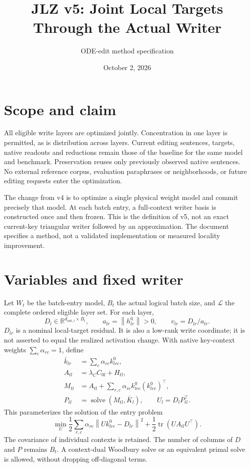 \documentclass[11pt]{article}
\title{JLZ v5: Joint Local Targets Through the Actual Writer}
\author{ODE-edit method specification}
\date{October 2, 2026}
\newcommand{\tr}{\operatorname{tr}}
\newcommand{\norm}[1]{\left\lVert#1\right\rVert}
\newcommand{\RR}{\mathbb R}
\begin{document}
\maketitle

\section{Scope and claim}
All eligible write layers are optimized jointly. Concentration in one
layer is permitted, as is distribution across layers. Current editing
sentences, targets, native readouts and reductions remain those of the
baseline for the same model and benchmark. Preservation reuses only
previously observed native sentences. No external reference corpus,
evaluation paraphrases or neighborhoods, or future editing requests enter
the optimization.

The change from v4 is to optimize a single physical weight model and
commit precisely that model. At each batch entry, a full-context writer
basis is constructed once and then frozen. This is the definition of v5,
not an exact current-key triangular writer followed by an approximation.
The document specifies a method, not a validated implementation or
measured locality improvement.

\section{Variables and fixed writer}
Let $W_t$ be the batch-entry model, $B_t$ the actual logical batch size,
and $\mathcal L$ the complete ordered eligible layer set. For each layer,
\[
D_l\in\RR^{d_{\mathrm{out},l}\times B_t},\qquad
a_{lr}=\norm{h^0_{lr}}>0,\qquad v_{lr}=D_{lr}/a_{lr}.
\]
$D_{lr}$ is a nominal local-target residual. It is also a low-rank write
coordinate; it is not asserted to equal the realized activation change.
With native key-context weights $\sum_c\alpha_{rc}=1$, define
\begin{align}
\bar k_{lr}&=\sum_c\alpha_{rc}k^0_{lrc},\\
A_{tl}&=\lambda_C C_{0l}+H_{tl},\\
M_{tl}&=A_{tl}+\sum_{r,c}\alpha_{rc}k^0_{lrc}(k^0_{lrc})^\top,\\
P_{tl}&=\operatorname{solve}(M_{tl},\bar K_l),\qquad U_l=D_lP_{tl}^\top.
\end{align}
This parameterizes the solution of the entry problem
\[
\min_U\frac12\sum_{r,c}\alpha_{rc}\norm{Uk^0_{lrc}-D_{lr}}^2
+\frac12\tr(UA_{tl}U^\top).
\]
The covariance of individual contexts is retained. The number of columns
of $D$ and $P$ remains $B_t$. A context-dual Woodbury solve or an equivalent
primal solve is allowed, without dropping off-diagonal terms.
\end{document}
